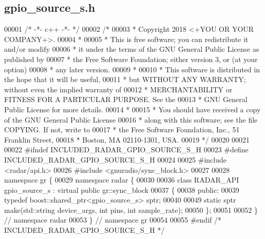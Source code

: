 \subsection{gpio\+\_\+source\+\_\+s.\+h}
\label{gpio__source__s_8h_source}

\begin{DoxyCode}
00001 \textcolor{comment}{/* -*- c++ -*- */}
00002 \textcolor{comment}{/*}
00003 \textcolor{comment}{ * Copyright 2018 <+YOU OR YOUR COMPANY+>.}
00004 \textcolor{comment}{ *}
00005 \textcolor{comment}{ * This is free software; you can redistribute it and/or modify}
00006 \textcolor{comment}{ * it under the terms of the GNU General Public License as published by}
00007 \textcolor{comment}{ * the Free Software Foundation; either version 3, or (at your option)}
00008 \textcolor{comment}{ * any later version.}
00009 \textcolor{comment}{ *}
00010 \textcolor{comment}{ * This software is distributed in the hope that it will be useful,}
00011 \textcolor{comment}{ * but WITHOUT ANY WARRANTY; without even the implied warranty of}
00012 \textcolor{comment}{ * MERCHANTABILITY or FITNESS FOR A PARTICULAR PURPOSE.  See the}
00013 \textcolor{comment}{ * GNU General Public License for more details.}
00014 \textcolor{comment}{ *}
00015 \textcolor{comment}{ * You should have received a copy of the GNU General Public License}
00016 \textcolor{comment}{ * along with this software; see the file COPYING.  If not, write to}
00017 \textcolor{comment}{ * the Free Software Foundation, Inc., 51 Franklin Street,}
00018 \textcolor{comment}{ * Boston, MA 02110-1301, USA.}
00019 \textcolor{comment}{ */}
00020 
00021 
00022 \textcolor{preprocessor}{#ifndef INCLUDED\_RADAR\_GPIO\_SOURCE\_S\_H}
00023 \textcolor{preprocessor}{#define INCLUDED\_RADAR\_GPIO\_SOURCE\_S\_H}
00024 
00025 \textcolor{preprocessor}{#include <radar/api.h>}
00026 \textcolor{preprocessor}{#include <gnuradio/sync\_block.h>}
00027 
00028 \textcolor{keyword}{namespace }gr \{
00029   \textcolor{keyword}{namespace }radar \{
00030 
00036     \textcolor{keyword}{class }RADAR_API gpio_source_s : \textcolor{keyword}{virtual} \textcolor{keyword}{public} gr::sync\_block
00037     \{
00038      \textcolor{keyword}{public}:
00039       \textcolor{keyword}{typedef} boost::shared\_ptr<gpio\_source\_s> sptr;
00040 
00049       \textcolor{keyword}{static} sptr make(std::string device\_args, \textcolor{keywordtype}{int} pins, \textcolor{keywordtype}{int} sample\_rate);
00050     \};
00051 
00052   \} \textcolor{comment}{// namespace radar}
00053 \} \textcolor{comment}{// namespace gr}
00054 
00055 \textcolor{preprocessor}{#endif }\textcolor{comment}{/* INCLUDED\_RADAR\_GPIO\_SOURCE\_S\_H */}\textcolor{preprocessor}{}
\end{DoxyCode}
